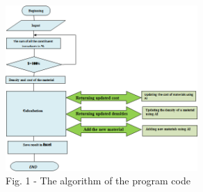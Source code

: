 \begin{figure}[H]
	\centering
	\includegraphics[width=0.65\textwidth]{media/ict3/image2}
	\caption*{Fig. 1 - The algorithm of the program code}
\end{figure}

